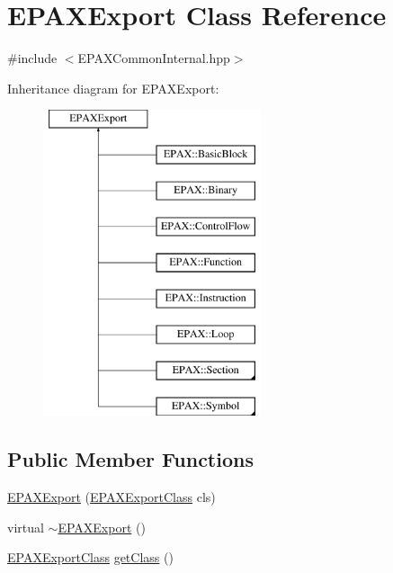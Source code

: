 \hypertarget{class_e_p_a_x_export}{\section{\-E\-P\-A\-X\-Export \-Class \-Reference}
\label{class_e_p_a_x_export}
}


{\ttfamily \#include $<$\-E\-P\-A\-X\-Common\-Internal.\-hpp$>$}

\-Inheritance diagram for \-E\-P\-A\-X\-Export\-:\begin{figure}[H]
\begin{center}
\leavevmode
\includegraphics[height=9.000000cm]{class_e_p_a_x_export}
\end{center}
\end{figure}
\subsection*{\-Public \-Member \-Functions}
\begin{DoxyCompactItemize}
\item 
\hyperlink{class_e_p_a_x_export_a72a477fc66fff1f008d38f96a4dc9566}{\-E\-P\-A\-X\-Export} (\hyperlink{_e_p_a_x_common_internal_8hpp_a9cc5d1140a7b3f3840983c0e1a032376}{\-E\-P\-A\-X\-Export\-Class} cls)
\item 
virtual \hyperlink{class_e_p_a_x_export_a6c62eeeea2db1ea174d4760a42cf9ce9}{$\sim$\-E\-P\-A\-X\-Export} ()
\item 
\hyperlink{_e_p_a_x_common_internal_8hpp_a9cc5d1140a7b3f3840983c0e1a032376}{\-E\-P\-A\-X\-Export\-Class} \hyperlink{class_e_p_a_x_export_a87de711519f311339e8db0182630de60}{get\-Class} ()
\end{DoxyCompactItemize}
